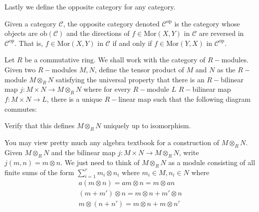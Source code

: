 \documentclass[12pt,reqno]{amsart}
\numberwithin{theorem}{section}
\theoremstyle{definition}
\theoremstyle{remark}
\numberwithin{equation}{section}
\newcommand{\cC}{\mathcal{C}}
\theoremstyle{definition}
\newcommand{\ob}{\mathrm{ob}}
\newcommand{\Mor}{\mathrm{Mor}}
\begin{document}
Lastly we define the opposite category for any category.
\begin{definition}
    Given a category $\cC$, the opposite category denoted $\cC^{\mathrm{op}}$ is the category whose objects are $\ob(\cC)$ and the directions of $f\in \Mor(X,Y)$ in $\cC$ are reversed in $\cC^{\mathrm{op}}$. That is, $f\in \Mor(X,Y)$ in $\cC$ if and only if $f\in \Mor(Y,X)$ in $\cC^{\mathrm{op}}$.
\end{definition}
\begin{exercise}
    Let $R$ be a commutative ring. We shall work with the category of $R-$modules. Given two $R-$modules $M,N$, define the tensor product of $M$ and $N$ as the $R-$module $M\otimes_RN$ satisfying the universal property that there is an $R-$bilinear map $j: M\times N \rightarrow M\otimes_R N$ where for every $R-$module $L$ $R-$bilinear map $f:M\times N \rightarrow L$, there is a unique $R-$linear map such that the following diagram commutes:
    \begin{center}
    \end{center}
    Verify that this defines $M\otimes_RN$ uniquely up to isomorphism.
\end{exercise}
\begin{remark}
    You may view pretty much any algebra textbook for a construction of $M\otimes_RN$. Given $M\otimes_RN$ and the bilinear map $j:M\times N \rightarrow M\otimes_RN$, write $j(m,n)=m\otimes n$.
    We just need to think of $M\otimes_RN$ as a module consisting of all finite sums of the form $\sum_{i=1}^rm_i\otimes n_i$ where $m_i \in M,n_i \in N$ where
    \begin{align*}
        a(m\otimes n) = am\otimes n =m\otimes an \\
        (m+m')\otimes n = m\otimes n + m'\otimes n \\
        m\otimes (n+n') = m\otimes n + m\otimes n'
    \end{align*}
\end{remark}
\end{document}
